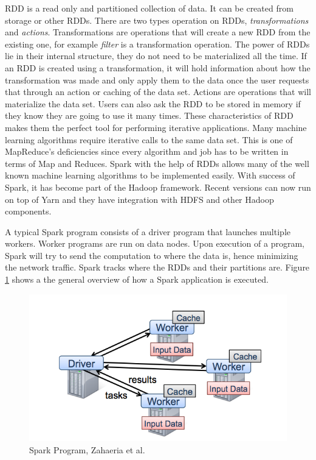 \documentclass[english]{tktltiki}
\begin{document}
RDD is a read only and partitioned collection of data. 
It can be created from storage or other RDDs. 
There are two types operation on RDDs, \textit{transformations} and \textit{actions}. 
Transformations are operations that will create a new RDD from the existing one, for example \textit{filter} is a transformation operation. 
The power of RDDs lie in their internal structure, they do not need to be materialized all the time. 
If an RDD is created using a transformation, it will hold information about how the transformation was made and only apply them to the data once the user requests that through an action or caching of the data set. 
Actions are operations that will materialize the data set. 
Users can also ask the RDD to be stored in memory if they know they are going to use it many times. 
These characteristics of RDD makes them the perfect tool for performing iterative applications. 
Many machine learning algorithms require iterative calls to the same data set. 
This is one of MapReduce's deficiencies since every algorithm and job has to be written in terms of Map and Reduces. 
Spark with the help of RDDs allows many of the well known machine learning algorithms to be implemented easily. 
With success of Spark, it has become part of the Hadoop framework. Recent versions can now run on top of Yarn and they have integration with HDFS and other Hadoop components. 

A typical Spark program consists of a driver program that launches multiple workers. 
Worker programs are run on data nodes. 
Upon execution of a program, Spark will try to send the computation to where the data is, hence minimizing the network traffic. 
Spark tracks where the RDDs and their partitions are. 
Figure \ref{fig:sparkprogram} shows a the general overview of how a Spark application is executed.

\begin{figure}[ht!]
\centering
\includegraphics[width=150mm]{figures/sparkprogram.png}
\caption[]{Spark Program, Zahaeria et al.\ \cite{zaharia10}}
\label{fig:sparkprogram}
\end{figure}
\end{document}
